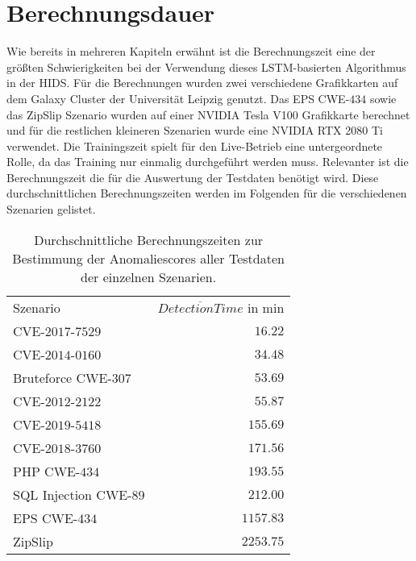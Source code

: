 \section{Berechnungsdauer}\label{sec:erg_time}
    Wie bereits in mehreren Kapiteln erwähnt ist die Berechnungszeit eine der größten Schwierigkeiten bei der Verwendung dieses \ac{LSTM}-basierten Algorithmus in der \ac{HIDS}.
    Für die Berechnungen wurden zwei verschiedene Grafikkarten auf dem Galaxy Cluster der Universität Leipzig genutzt.
    Das EPS CWE-$434$ sowie das ZipSlip Szenario wurden auf einer NVIDIA Tesla V100 Grafikkarte berechnet und für die restlichen kleineren Szenarien wurde eine NVIDIA RTX 2080 Ti verwendet.
    Die Trainingszeit spielt für den Live-Betrieb eine untergeordnete Rolle, da das Training nur einmalig durchgeführt werden muss.
    Relevanter ist die Berechnungszeit die für die Auswertung der Testdaten benötigt wird.
    Diese durchschnittlichen Berechnungszeiten werden im Folgenden für die verschiedenen Szenarien gelistet.
    \begin{table}[ht]
        \centering
        \begin{tabular}{lr}
            \hline
            \rowcolor{GruvGray!36}
            \multicolumn{2}{c}{Berechnungszeiten der verschiedenen Szenarien}\\
            \toprule
            Szenario &  $\overline{Detection Time}$ in min\\
            \midrule
            \rowcolor{GruvGray!16}
            CVE-$2017$-$7529$ & $16.22$ \\
            CVE-$2014$-$0160$ & $34.48$ \\
            \rowcolor{GruvGray!16}
            Bruteforce CWE-$307$ & $53.69$ \\
            CVE-$2012$-$2122$ & $55.87$ \\
            \rowcolor{GruvGray!16}
            CVE-$2019$-$5418$ & $155.69$ \\
            CVE-$2018$-$3760$ & $171.56$ \\
            \rowcolor{GruvGray!16}
            PHP CWE-$434$ & $193.55$ \\
            SQL Injection CWE-$89$ & $212.00$ \\
            \rowcolor{GruvGray!16}
            EPS CWE-$434$ & $1157.83$ \\	
            ZipSlip & $2253.75$ \\	
            \hline
        \end{tabular}
        \caption[Ergebnisse Berechnungsdauer Szenarien]{Durchschnittliche Berechnungszeiten zur Bestimmung der Anomaliescores aller Testdaten der einzelnen Szenarien.}
        \label{tab:LSTM_erg_time}
    \end{table}
